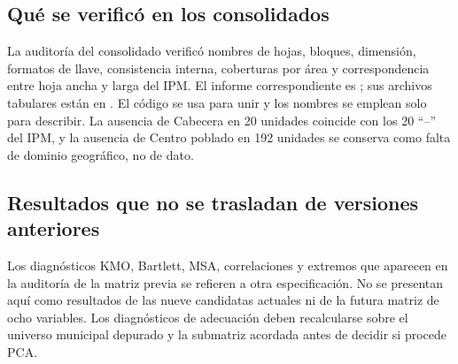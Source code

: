 \subsection{Qué se verificó en los consolidados}

La auditoría del consolidado verificó nombres de hojas, bloques, dimensión, formatos de llave, consistencia interna, coberturas por área y correspondencia entre hoja ancha y larga del IPM. El informe correspondiente es ; sus archivos tabulares están en . El código se usa para unir y los nombres se emplean solo para describir. La ausencia de Cabecera en 20 unidades coincide con los 20 \enquote{--} del IPM, y la ausencia de Centro poblado en 192 unidades se conserva como falta de dominio geográfico, no de dato.

\subsection{Resultados que no se trasladan de versiones anteriores}

Los diagnósticos KMO, Bartlett, MSA, correlaciones y extremos que aparecen en la auditoría de la matriz previa se refieren a otra especificación. No se presentan aquí como resultados de las nueve candidatas actuales ni de la futura matriz de ocho variables. Los diagnósticos de adecuación deben recalcularse sobre el universo municipal depurado y la submatriz acordada antes de decidir si procede PCA.
